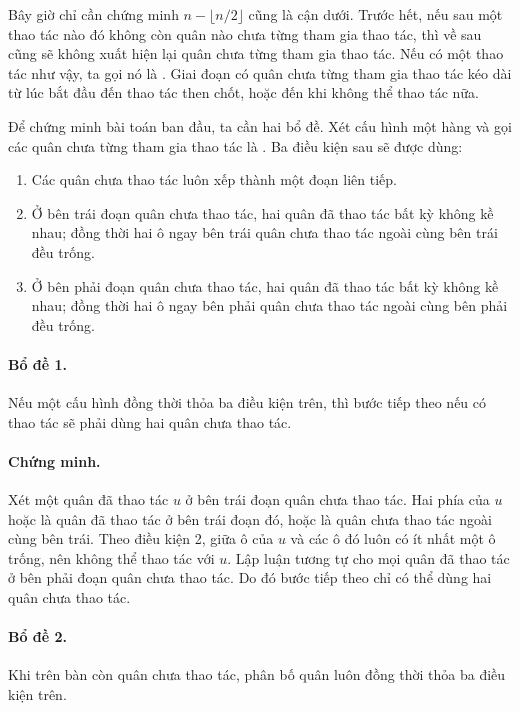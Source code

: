 \documentclass[11pt]{article}
\begin{document}
Bây giờ chỉ cần chứng minh \(n-\lfloor n/2\rfloor\) cũng là cận dưới. Trước
hết, nếu sau một thao tác nào đó không còn quân nào chưa từng tham gia thao
tác, thì về sau cũng sẽ không xuất hiện lại quân chưa từng tham gia thao tác.
Nếu có một thao tác như vậy, ta gọi nó là . Giai đoạn
có quân chưa từng tham gia thao tác kéo dài từ lúc bắt đầu đến thao tác then
chốt, hoặc đến khi không thể thao tác nữa.

Để chứng minh bài toán ban đầu, ta cần hai bổ đề. Xét cấu hình một hàng và gọi
các quân chưa từng tham gia thao tác là . Ba điều kiện
sau sẽ được dùng:
\begin{enumerate}[label=\arabic*.,leftmargin=2.5em]
  \item Các quân chưa thao tác luôn xếp thành một đoạn liên tiếp.
  \item Ở bên trái đoạn quân chưa thao tác, hai quân đã thao tác bất kỳ không
  kề nhau; đồng thời hai ô ngay bên trái quân chưa thao tác ngoài cùng bên trái
  đều trống.
  \item Ở bên phải đoạn quân chưa thao tác, hai quân đã thao tác bất kỳ không
  kề nhau; đồng thời hai ô ngay bên phải quân chưa thao tác ngoài cùng bên
  phải đều trống.
\end{enumerate}

\paragraph{Bổ đề 1.}
Nếu một cấu hình đồng thời thỏa ba điều kiện trên, thì bước tiếp theo nếu có
thao tác sẽ phải dùng hai quân chưa thao tác.

\paragraph{Chứng minh.}
Xét một quân đã thao tác \(u\) ở bên trái đoạn quân chưa thao tác. Hai phía của
\(u\) hoặc là quân đã thao tác ở bên trái đoạn đó, hoặc là quân chưa thao tác
ngoài cùng bên trái. Theo điều kiện 2, giữa ô của \(u\) và các ô đó luôn có ít
nhất một ô trống, nên không thể thao tác với \(u\). Lập luận tương tự cho mọi
quân đã thao tác ở bên phải đoạn quân chưa thao tác. Do đó bước tiếp theo chỉ
có thể dùng hai quân chưa thao tác.

\paragraph{Bổ đề 2.}
Khi trên bàn còn quân chưa thao tác, phân bố quân luôn đồng thời thỏa ba điều
kiện trên.
\end{document}
